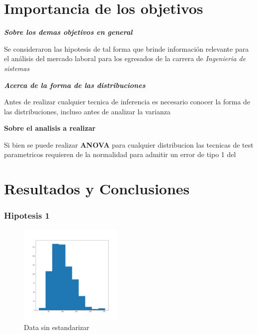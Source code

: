 \documentclass{beamer}
\begin{document}


\section{Importancia de los objetivos}

\begin{frame}
  \textit{\textbf{
    Sobre los demas objetivos en general
  }}
  \newline

  Se consideraron las hipotesis de tal forma que brinde
  información relevante para el análisis del mercado laboral
  para los egresados de la carrera de \textit{Ingenieria de
  sistemas}

\end{frame}


\begin{frame}
  \textbf{\textit{
    Acerca de la forma de las distribuciones
  }}

  Antes de realizar cualquier tecnica de inferencia es necesario conocer
  la forma de las distribuciones, incluso antes de analizar la varianza

  \textbf{
    Sobre el analisis a realizar
  }

  Si bien se puede realizar \textbf{ANOVA} \footnotemark para cualquier distribucion
  las tecnicas de test parametricos requieren de la normalidad para admitir un error de
  tipo 1 del 



\end{frame}



\section{Resultados y Conclusiones}

\begin{frame}
  \frametitle{Hipotesis 1}
  \begin{figure}[t]
    \caption{Data sin estandarizar}
    \includegraphics[width=5cm]{Figure_1.png}
  \end{figure}

\end{frame}
\end{document}
